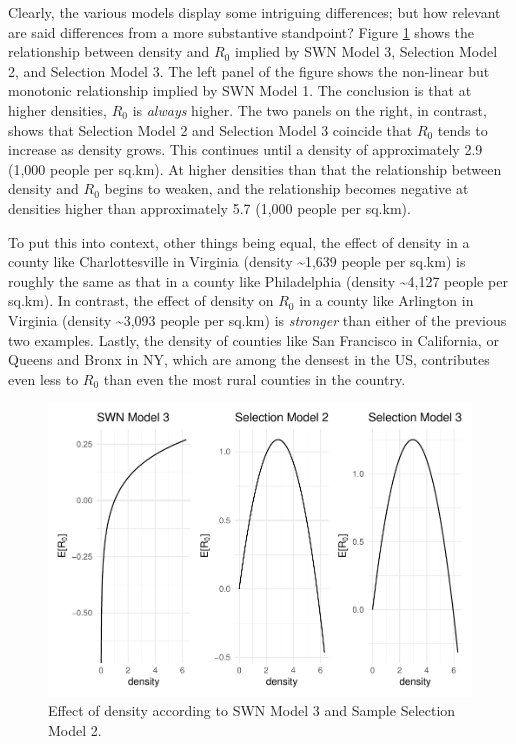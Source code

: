 \documentclass[preprint, 3p,
authoryear]{elsarticle} %
\begin{document}
Clearly, the various models display some intriguing differences; but how
relevant are said differences from a more substantive standpoint? Figure
\ref{fig:comparison-results} shows the relationship between density and
\(R_0\) implied by SWN Model 3, Selection Model 2, and Selection Model
3. The left panel of the figure shows the non-linear but monotonic
relationship implied by SWN Model 1. The conclusion is that at higher
densities, \(R_0\) is \emph{always} higher. The two panels on the right,
in contrast, shows that Selection Model 2 and Selection Model 3 coincide
that \(R_0\) tends to increase as density grows. This continues until a
density of approximately 2.9 (1,000 people per sq.km). At higher
densities than that the relationship between density and \(R_0\) begins
to weaken, and the relationship becomes negative at densities higher
than approximately 5.7 (1,000 people per sq.km).

To put this into context, other things being equal, the effect of
density in a county like Charlottesville in Virginia (density
\textasciitilde1,639 people per sq.km) is roughly the same as that in a
county like Philadelphia (density \textasciitilde4,127 people per
sq.km). In contrast, the effect of density on \(R_0\) in a county like
Arlington in Virginia (density \textasciitilde3,093 people per sq.km) is
\emph{stronger} than either of the previous two examples. Lastly, the
density of counties like San Francisco in California, or Queens and
Bronx in NY, which are among the densest in the US, contributes even
less to \(R_0\) than even the most rural counties in the country.

\begin{figure}
\includegraphics[width=1\linewidth]{R0-Density-Reanalysis_files/figure-latex/comparison-results-1} \caption{\label{fig:comparison-results}Effect of density according to SWN Model 3 and Sample Selection Model 2.}\label{fig:comparison-results}
\end{figure}
\end{document}

